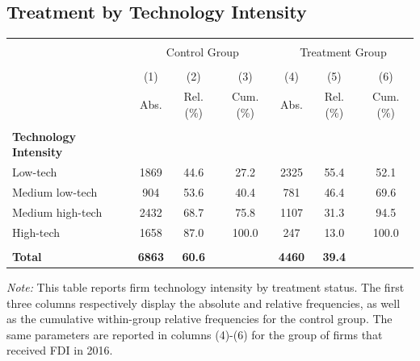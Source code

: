 \documentclass[a4paper,11pt]{scrartcl}
\begin{document}
\setcounter{figure}{0}
\subsection{Treatment by Technology Intensity}
\label{app:tech}

\begin{table}[htbp]
	\centering

\begin{threeparttable}

\begin{tabular}{lcccccc} 
\hline
\hline \\[-0.8em]
 & \multicolumn{3}{c}{Control Group} & \multicolumn{3}{c}{Treatment Group} \\ \cline{2-7} \\[-0.8em]
 & (1) & (2) & (3) & (4) & (5) & (6) \\
 & Abs. & Rel.(\%) & Cum.(\%)  & Abs. & Rel.(\%) & Cum.(\%)\\
\hline \\[-0.8em]
\textbf{Technology Intensity} & & & & & \\
Low-tech &1869&44.6&27.2&2325&55.4&52.1 \\
Medium low-tech &904&53.6&40.4&781&46.4&69.6 \\
Medium high-tech &2432&68.7&75.8&1107&31.3&94.5 \\
High-tech &1658&87.0&100.0&247&13.0&100.0 \\ \\[-0.8em]
\textbf{Total}&\textbf{6863}&\textbf{60.6}&&\textbf{4460}&\textbf{39.4}& \\
\hline
\hline
\end{tabular}
\begin{tablenotes}[flushleft]
\footnotesize
\item\textit{Note:} This table reports firm technology intensity by treatment status. The first three columns respectively display the absolute and relative frequencies, as well as the cumulative within-group relative frequencies for the control group. The same parameters are reported in columns (4)-(6) for the group of firms that received FDI in 2016. 


\end{tablenotes}
\end{threeparttable}
\end{table}
\newpage

\newenvironment{changemargin}[2]{%
\begin{list}{}{%
\setlength{\topsep}{0pt}%
\setlength{\leftmargin}{#1}%
\setlength{\rightmargin}{#2}%
\setlength{\listparindent}{\parindent}%
\setlength{\itemindent}{\parindent}%
\setlength{\parsep}{\parskip}%
}%
\item[]}{\end{list}}
\end{document}
